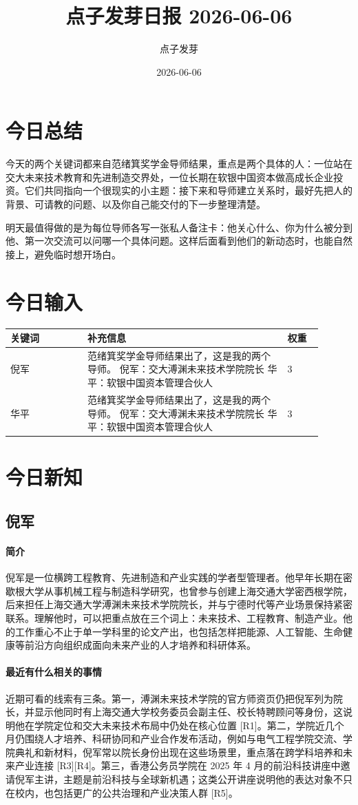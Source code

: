 \documentclass[UTF8,zihao=-4]{ctexart}
\title{\bfseries 点子发芽日报 2026-06-06}
\author{点子发芽}
\date{2026-06-06}
\begin{document}
\maketitle
\section*{今日总结}
今天的两个关键词都来自范绪箕奖学金导师结果，重点是两个具体的人：一位站在交大未来技术教育和先进制造交界处，一位长期在软银中国资本做高成长企业投资。它们共同指向一个很现实的小主题：接下来和导师建立关系时，最好先把人的背景、可请教的问题、以及你自己能交付的下一步整理清楚。

明天最值得做的是为每位导师各写一张私人备注卡：他关心什么、你为什么被分到他、第一次交流可以问哪一个具体问题。这样后面看到他们的新动态时，也能自然接上，避免临时想开场白。
\section*{今日输入}
\begin{longtable}{|p{0.22\linewidth}|p{0.58\linewidth}|p{0.10\linewidth}|}
\hline
\textbf{关键词} & \textbf{补充信息} & \textbf{权重} \\
\hline
倪军 & 范绪箕奖学金导师结果出了，这是我的两个导师。
倪军：交大溥渊未来技术学院院长
华平：软银中国资本管理合伙人 & 3 \\
\hline
华平 & 范绪箕奖学金导师结果出了，这是我的两个导师。
倪军：交大溥渊未来技术学院院长
华平：软银中国资本管理合伙人 & 3 \\
\hline
\end{longtable}
\section*{今日新知}
\subsection*{倪军}
\paragraph{简介} 倪军是一位横跨工程教育、先进制造和产业实践的学者型管理者。他早年长期在密歇根大学从事机械工程与制造科学研究，也曾参与创建上海交通大学密西根学院，后来担任上海交通大学溥渊未来技术学院院长，并与宁德时代等产业场景保持紧密联系。理解他时，可以把重点放在三个词上：未来技术、工程教育、制造产业。他的工作重心不止于单一学科里的论文产出，也包括怎样把能源、人工智能、生命健康等前沿方向组织成面向未来产业的人才培养和科研体系。
\paragraph{最近有什么相关的事情} 近期可看的线索有三条。第一，溥渊未来技术学院的官方师资页仍把倪军列为院长，并显示他同时有上海交通大学校务委员会副主任、校长特聘顾问等身份，这说明他在学院定位和交大未来技术布局中仍处在核心位置 [R1]。第二，学院近几个月仍围绕人才培养、科研协同和产业合作发布活动，例如与电气工程学院交流、学院典礼和新材料，倪军常以院长身份出现在这些场景里，重点落在跨学科培养和未来产业连接 [R3][R4]。第三，香港公务员学院在 2025 年 4 月的前沿科技讲座中邀请倪军主讲，主题是前沿科技与全球新机遇；这类公开讲座说明他的表达对象不只在校内，也包括更广的公共治理和产业决策人群 [R5]。
\end{document}
